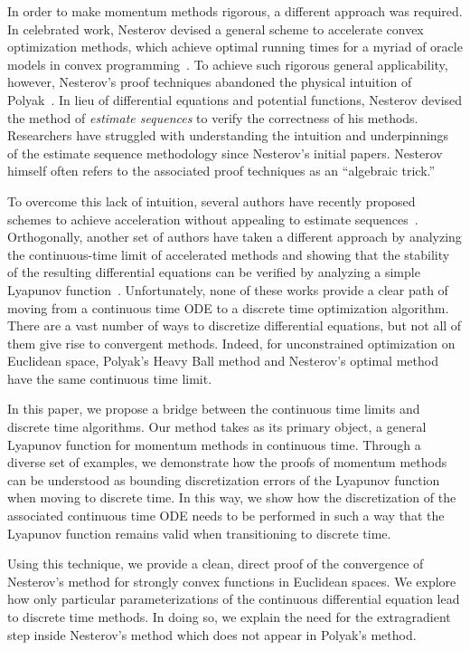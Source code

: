 \documentclass[11pt]{article}
\theoremstyle{plain}
\begin{document}
In order to make momentum methods rigorous, a different approach was required.  In celebrated work, Nesterov devised a general scheme to accelerate convex optimization methods, which achieve optimal running times for a myriad of oracle models in convex programming~\cite{Nesterov04}.  To achieve such rigorous general applicability, however, Nesterov's proof techniques abandoned the physical intuition of Polyak~\cite{Nesterov04}.  In lieu of differential equations and potential functions, Nesterov devised the method of \emph{estimate sequences} to verify the correctness of his methods.  Researchers have struggled with understanding the intuition and underpinnings of the estimate sequence methodology since Nesterov's initial papers.  Nesterov himself often refers to the associated proof techniques as an ``algebraic trick.''  

To overcome this lack of intuition, several authors have recently proposed schemes to achieve acceleration without appealing to estimate sequences~\cite{Fazel, BubeckLeeSingh15, Lessard14}.  Orthogonally, another set of authors have taken a different approach by analyzing the continuous-time limit of accelerated methods and showing that the stability of the resulting differential equations can be verified by analyzing a simple Lyapunov function~\cite{SuBoydCandes14,Krichene15,Acceleration}.  Unfortunately, none of these works provide a clear path of moving from a continuous time ODE to a discrete time optimization algorithm.  There are a vast number of ways to discretize differential equations, but not all of them give rise to convergent methods.  Indeed, for unconstrained optimization on Euclidean space, Polyak's Heavy Ball method and Nesterov's optimal method have the same continuous time limit.

In this paper, we propose a bridge between the continuous time limits and discrete time algorithms.  Our method takes as its primary object, a general Lyapunov function for momentum methods in continuous time.  Through a diverse set of examples, we demonstrate how the proofs of momentum methods can be understood as bounding discretization errors of the Lyapunov function when moving to discrete time.  In this way, we show how the discretization of the associated continuous time ODE needs to be performed in such a way that the Lyapunov function remains valid when transitioning to discrete time.

Using this technique, we provide a clean, direct proof of the convergence of Nesterov's method for strongly convex functions in Euclidean spaces.  We explore how only particular parameterizations of the continuous differential equation lead to discrete time methods.  In doing so, we explain the need for the extragradient step inside Nesterov's method which does not appear in Polyak's method.  
\end{document}

